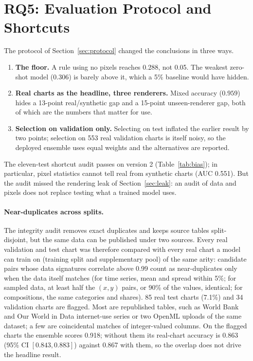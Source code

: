 \section{RQ5: Evaluation Protocol and Shortcuts}
\label{sec:rq5}

The protocol of Section~\ref{sec:protocol} changed the conclusions in three ways.

\begin{enumerate}[leftmargin=1.4em]
  \item \textbf{The floor.} A rule using no pixels reaches 0.288, not 0.05. The weakest
  zero-shot model (0.306) is barely above it, which a 5\% baseline would have hidden.
  \item \textbf{Real charts as the headline, three renderers.} Mixed accuracy ($0.959$)
  hides a 13-point real/synthetic gap and a 15-point unseen-renderer gap, both of which
  are the numbers that matter for use.
  \item \textbf{Selection on validation only.} Selecting on test inflated the earlier
  result by two points; selection on 553 real validation charts is itself noisy, so the
  deployed ensemble uses equal weights and the alternatives are reported.
\end{enumerate}

The eleven-test shortcut audit passes on version 2 (Table~\ref{tab:bias}); in
particular, pixel statistics cannot tell real from synthetic charts (AUC 0.551). But the
audit missed the rendering leak of Section~\ref{sec:leak}: an audit of data and pixels
does not replace testing what a trained model uses.

\paragraph{Near-duplicates across splits.} The integrity audit removes exact duplicates and keeps
source tables split-disjoint, but the same data can be published under two sources.
Every real validation and test chart was therefore compared with every real chart a
model can train on (training split and supplementary pool) of the same arity: candidate
pairs whose data signatures correlate above 0.99 count as near-duplicates only when the
data itself matches (for time series, mean and spread within 5\%; for sampled data, at
least half the $(x,y)$ pairs, or 90\% of the values, identical; for compositions, the same
categories and shares). 85 real test charts (7.1\%) and 34 validation charts are flagged.
Most are republished tables, such as World Bank and Our World in Data internet-use
series or two OpenML uploads of the same dataset; a few are coincidental matches of
integer-valued columns. On the flagged charts the ensemble scores 0.918; without them
its real-chart accuracy is 0.863 (95\% CI $[0.843, 0.883]$) against 0.867 with them, so
the overlap does not drive the headline result.

